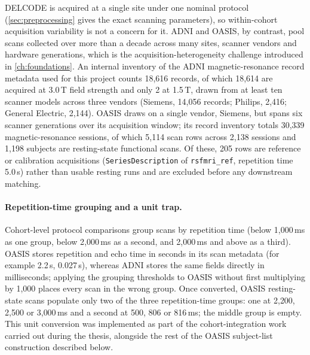 \ac{DELCODE} is acquired at a single site under one nominal protocol
(\autoref{sec:preprocessing} gives the exact scanning parameters), so within-cohort
acquisition variability is not a concern for it. \ac{ADNI} and \ac{OASIS}, by contrast,
pool scans collected over more than a decade across many sites, scanner vendors and
hardware generations, which is the acquisition-heterogeneity challenge introduced in
\autoref{ch:foundations}. An internal inventory of the \ac{ADNI} magnetic-resonance record
metadata used for this project counts 18,616 records, of which 18,614 are acquired at
3.0\,T field strength and only 2 at 1.5\,T, drawn from at least ten scanner models across
three vendors (Siemens, 14,056 records; Philips, 2,416; General Electric, 2,144). \ac{OASIS}
draws on a single vendor, Siemens, but spans six scanner generations over its acquisition
window; its record inventory totals 30,339 magnetic-resonance sessions, of which 5,114
scan rows across 2,138 sessions and 1,198 subjects are resting-state functional scans. Of
these, 205 rows are reference or calibration acquisitions (\texttt{SeriesDescription} of
\texttt{rsfmri\_ref}, repetition time 5.0\,s) rather than usable resting runs and are
excluded before any downstream matching.

\paragraph{Repetition-time grouping and a unit trap.} Cohort-level protocol comparisons
group scans by repetition time (below 1{,}000\,ms as one group, below 2{,}000\,ms as a
second, and 2{,}000\,ms and above as a third). \ac{OASIS} stores repetition and echo time
in seconds in its scan metadata (for example 2.2\,s, 0.027\,s), whereas \ac{ADNI} stores
the same fields directly in milliseconds; applying the grouping thresholds to \ac{OASIS}
without first multiplying by 1{,}000 places every scan in the wrong group. Once converted,
\ac{OASIS} resting-state scans populate only two of the three repetition-time groups: one
at 2{,}200, 2{,}500 or 3{,}000\,ms and a second at 500, 806 or 816\,ms; the middle group is
empty. This unit conversion was implemented as part of the cohort-integration work carried
out during the thesis, alongside the rest of the \ac{OASIS} subject-list construction
described below.

